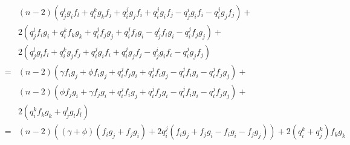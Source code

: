 \documentclass{article}
\begin{document}
\begin{eqnarray*}
&&  (n-2)(q_j^lg_if_l + 
          q_i^kg_kf_j + 
          q_i^jg_jf_i +
          q_i^jg_if_j -
          q_j^ig_if_i -    
          q_i^jg_jf_j) +\\
&&      2(q_j^lf_ig_i + 
          q_i^kf_kg_k + 
          q_i^jf_jg_j +
          q_i^jf_ig_i -
          q_j^lf_ig_i -    
          q_i^jf_jg_j)+\\
&&      2(q_j^lg_lf_l + 
          q_i^kg_jf_j + 
          q_i^jg_if_i +
          q_i^jg_jf_j -
          q_j^ig_if_i -    
          q_i^jg_jf_j)\\
&=& (n-2)(\gamma f_ig_j + 
          \phi   f_ig_j + 
          q_i^jf_jg_i +
          q_i^jf_ig_j -
          q_i^jf_ig_i -    
          q_i^jf_jg_j)+\\
&&  (n-2)(\phi f_jg_i + 
          \gamma f_jg_i + 
          q_i^jf_ig_j +
          q_i^jf_jg_i -
          q_i^jf_ig_i -    
          q_i^jf_jg_j) +\\
&&      2\left(q_i^kf_kg_k + q_j^lg_lf_l\right)\\
&=&     (n-2)\left((\gamma + \phi)(f_ig_j + f_jg_i) + 
              2q_i^j(f_ig_j + f_jg_i - f_ig_i - f_jg_j)\right) +
        2(q_i^k+q_j^k)f_kg_k\\
\end{eqnarray*}
\end{document}
